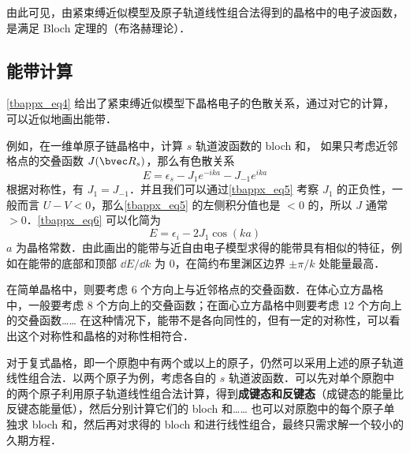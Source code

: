 由此可见，由紧束缚近似模型及原子轨道线性组合法得到的晶格中的电子波函数，是满足 Bloch 定理的（布洛赫理论）．

\subsection{能带计算}
\autoref{tbappx_eq4} 给出了紧束缚近似模型下晶格电子的色散关系，通过对它的计算，可以近似地画出能带．

例如，在一维单原子链晶格中，计算 $s$ 轨道波函数的 bloch 和， 如果只考虑近邻格点的交叠函数 $J(\bvec R_s)$，那么有色散关系
\begin{equation}\label{tbappx_eq6}
E=\epsilon_s-J_1 e^{-i k a}-J_{-1}e^{ika}
\end{equation}
根据对称性，有 $J_1=J_{-1}$．并且我们可以通过\autoref{tbappx_eq5} 考察 $J_1$ 的正负性，一般而言 $U-V<0$，那么\autoref{tbappx_eq5} 的左侧积分值也是 $<0$ 的，所以 $J$ 通常 $>0$．\autoref{tbappx_eq6} 可以化简为
\begin{equation}
E=\epsilon_i-2J_1\cos(ka)
\end{equation}
$a$ 为晶格常数．由此画出的能带与近自由电子模型求得的能带具有相似的特征，例如在能带的底部和顶部 $\dd E/\dd k$ 为 $0$，在简约布里渊区边界 $\pm \pi/k$ 处能量最高．

在简单晶格中，则要考虑 $6$ 个方向上与近邻格点的交叠函数．在体心立方晶格中，一般要考虑 $8$ 个方向上的交叠函数；在面心立方晶格中则要考虑 $12$ 个方向上的交叠函数…… 在这种情况下，能带不是各向同性的，但有一定的对称性，可以看出这个对称性和晶格的对称性相符合．

对于复式晶格，即一个原胞中有两个或以上的原子，仍然可以采用上述的原子轨道线性组合法．以两个原子为例，考虑各自的 $s$ 轨道波函数．可以先对单个原胞中的两个原子利用原子轨道线性组合法计算，得到\textbf{成键态和反键态}（成键态的能量比反键态能量低），然后分别计算它们的 bloch 和…… 也可以对原胞中的每个原子单独求 bloch 和，然后再对求得的 bloch 和进行线性组合，最终只需求解一个较小的久期方程．